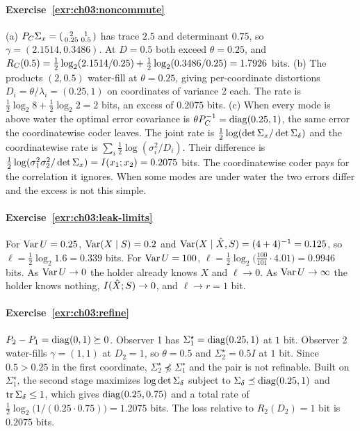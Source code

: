 \paragraph{Exercise~\ref{exr:ch03:noncommute}}
(a) $P_C\Sigma_x=\begin{psmallmatrix}2&1\\0.25&0.5\end{psmallmatrix}$ has trace $2.5$ and determinant $0.75$, so $\gamma=(2.1514,0.3486)$. At $D=0.5$ both exceed $\theta=0.25$, and $R_C(0.5)=\frac12\log_2(2.1514/0.25)+\frac12\log_2(0.3486/0.25)=1.7926$ bits.
(b) The products $(2,0.5)$ water-fill at $\theta=0.25$, giving per-coordinate distortions $D_i=\theta/\lambda_i=(0.25,1)$ on coordinates of variance $2$ each. The rate is $\frac12\log_2 8+\frac12\log_2 2=2$ bits, an excess of $0.2075$ bits.
(c) When every mode is above water the optimal error covariance is $\theta P_C^{-1}=\operatorname{diag}(0.25,1)$, the same error the coordinatewise coder leaves. The joint rate is $\frac12\log(\det\Sigma_x/\det\Sigma_\delta)$ and the coordinatewise rate is $\sum_i\frac12\log(\sigma_i^2/D_i)$. Their difference is $\frac12\log(\sigma_1^2\sigma_2^2/\det\Sigma_x)=I(x_1;x_2)=0.2075$ bits. The coordinatewise coder pays for the correlation it ignores. When some modes are under water the two errors differ and the excess is not this simple.

\paragraph{Exercise~\ref{exr:ch03:leak-limits}}
For $\operatorname{Var} U=0.25$, $\operatorname{Var}(X\mid S)=0.2$ and $\operatorname{Var}(X\mid\hat X,S)=(4+4)^{-1}=0.125$, so $\ell=\frac12\log_2 1.6=0.339$ bits. For $\operatorname{Var} U=100$, $\ell=\frac12\log_2\bigl(\frac{100}{101}\cdot4.01\bigr)=0.9946$ bits. As $\operatorname{Var} U\to0$ the holder already knows $X$ and $\ell\to0$. As $\operatorname{Var} U\to\infty$ the holder knows nothing, $I(\hat X;S)\to0$, and $\ell\to r=1$ bit.

\paragraph{Exercise~\ref{exr:ch03:refine}}
$P_2-P_1=\operatorname{diag}(0,1)\succeq0$. Observer 1 has $\Sigma_1^\star=\operatorname{diag}(0.25,1)$ at $1$ bit. Observer 2 water-fills $\gamma=(1,1)$ at $D_2=1$, so $\theta=0.5$ and $\Sigma_2^\star=0.5I$ at $1$ bit. Since $0.5>0.25$ in the first coordinate, $\Sigma_2^\star\not\preceq\Sigma_1^\star$ and the pair is not refinable. Built on $\Sigma_1^\star$, the second stage maximizes $\log\det\Sigma_\delta$ subject to $\Sigma_\delta\preceq\operatorname{diag}(0.25,1)$ and $\operatorname{tr}\Sigma_\delta\le1$, which gives $\operatorname{diag}(0.25,0.75)$ and a total rate of $\frac12\log_2\bigl(1/(0.25\cdot0.75)\bigr)=1.2075$ bits. The loss relative to $R_2(D_2)=1$ bit is $0.2075$ bits.
